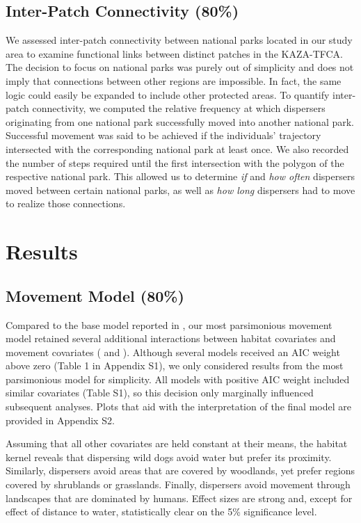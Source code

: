 \documentclass[abstract=on,10pt,a4paper,bibliography=totocnumbered]{article}
\begin{document}
\subsection{Inter-Patch Connectivity (80\%)}
We assessed inter-patch connectivity between national parks located in our study
area to examine functional links between distinct patches in the KAZA-TFCA. The
decision to focus on national parks was purely out of simplicity and does not
imply that connections between other regions are impossible. In fact, the same
logic could easily be expanded to include other protected areas. To quantify
inter-patch connectivity, we computed the relative frequency at which dispersers
originating from one national park successfully moved into another national
park. Successful movement was said to be achieved if the individuals' trajectory
intersected with the corresponding national park at least once. We also recorded
the number of steps required until the first intersection with the polygon of
the respective national park. This allowed us to determine \textit{if} and
\textit{how often} dispersers moved between certain national parks, as well as
\textit{how long} dispersers had to move to realize those connections.

\section{Results}
\subsection{Movement Model (80\%)}
Compared to the base model reported in \citep{Hofmann.2021}, our most
parsimonious movement model retained several additional interactions between
habitat covariates and movement covariates ( and
). Although several models received an AIC weight
above zero (Table 1 in Appendix S1), we only considered results from the most
parsimonious model for simplicity. All models with positive AIC weight included
similar covariates (Table S1), so this decision only marginally influenced
subsequent analyses. Plots that aid with the interpretation of the final model
are provided in Appendix S2.

Assuming that all other covariates are held constant at their means, the habitat
kernel reveals that dispersing wild dogs avoid water but prefer its proximity.
Similarly, dispersers avoid areas that are covered by woodlands, yet prefer
regions covered by shrublands or grasslands. Finally, dispersers avoid movement
through landscapes that are dominated by humans. Effect sizes are strong and,
except for effect of \textsf{distance to water}, statistically clear on the 5\%
significance level.
\end{document}
